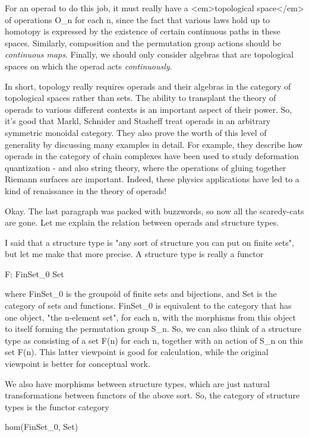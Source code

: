 For an operad to do this job, it must really have a <em>topological
space</em> of operations O_{n} for each n, since the fact that
various laws hold up to homotopy is expressed by the existence of
certain continuous paths in these spaces.  Similarly, composition and
the permutation group actions should be \emph{continuous maps}.  Finally, we
should only consider algebras that are topological spaces on which the
operad acts \emph{continuously}.

In short, topology really requires operads and their algebras in the
category of topological spaces rather than sets.  The ability to
transplant the theory of operads to various different contexts is an
important aspect of their power.  So, it's good that Markl, Schnider
and Stasheff treat operads in an arbitrary symmetric monoidal category.  
They also prove the worth of this level of generality by discussing many 
examples in detail.  For example, they describe how operads in the category 
of chain complexes have been used to study deformation quantization - and 
also string theory, where the operations of gluing together Riemann 
surfaces are important.  Indeed, these physics applications have led to 
a kind of renaissance in the theory of operads!

Okay.  The last paragraph was packed with buzzwords, so now all
the scaredy-cats are gone.  Let me explain the relation between
operads and structure types.

I said that a structure type is "any sort of structure you can
put on finite sets", but let me make that more precise.  A structure
type is really a functor

F: FinSet_{0} \to  Set

where FinSet_{0} is the groupoid of finite sets and bijections,
and Set is the category of sets and functions.  FinSet_{0} is 
equivalent to the category that has one object, "the n-element
set", for each n, with the morphisms from this object to itself
forming the permutation group S_{n}.  So, we can also think of a
structure type as consisting of a set F(n) for each n, together 
with an action of S_{n} on this set F(n).  This latter viewpoint is 
good for calculation, while the original viewpoint is better for
conceptual work.

We also have morphisms between structure types, which are just
natural transformations between functors of the above sort.  
So, the category of structure types is the functor category 

hom(FinSet_{0}, Set)

